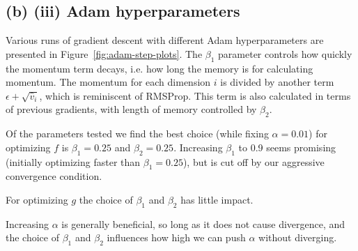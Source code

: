 \subsection{(b) (iii) Adam hyperparameters}
Various runs of gradient descent with different Adam hyperparameters are presented
in Figure~\ref{fig:adam-step-plots}.
The $\beta_1$ parameter controls how quickly the momentum term decays, i.e.
how long the memory is for calculating momentum. The momentum for each
dimension $i$ is divided by another term $\epsilon + \sqrt{\hat v_i}$,
which is reminiscent of RMSProp. This term is also calculated in
terms of previous gradients, with length of memory controlled by $\beta_2$.

Of the parameters tested we find the best choice (while fixing $\alpha=0.01$) for
optimizing $f$ is $\beta_1=0.25$ and $\beta_2=0.25$. Increasing $\beta_1$ to 0.9
seems promising (initially optimizing faster than $\beta_1=0.25$),
but is cut off by our aggressive convergence condition.

For optimizing $g$ the choice of $\beta_1$ and $\beta_2$ has little impact.

Increasing $\alpha$ is generally beneficial, so long as it does not cause divergence,
and the choice of $\beta_1$ and $\beta_2$ influences how high we can push $\alpha$ without diverging.

